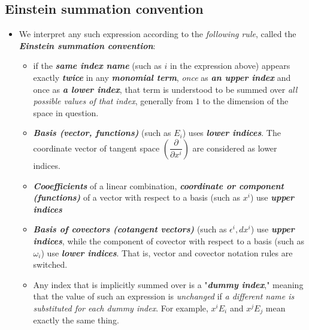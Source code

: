 \documentclass[11pt]{article}
\begin{document}
\subsection{Einstein summation convention}
\begin{itemize}
\item \begin{remark}
We interpret any such expression according to the \emph{following rule}, called the \emph{\textbf{Einstein summation convention}}:
\begin{itemize}
\item if the \textbf{\emph{same index name}} (such as $i$ in the expression above) appears exactly \textbf{\emph{twice}} in any \emph{\textbf{monomial term}}, \emph{once} as \emph{\textbf{an upper index}} and once as \emph{\textbf{a lower index}}, that term is understood to be summed over \emph{all possible values of that index}, generally from $1$ to the dimension of the space in question. 

\item \emph{\textbf{Basis (vector, functions)}} (such as $E_i$) uses  \emph{\textbf{lower indices}}. The coordinate vector of tangent space $(\dfrac{\partial}{\partial x^{i}})$ are considered as lower indices. 

\item \emph{\textbf{Cooefficients}} of a linear combination, \emph{\textbf{coordinate or component (functions)}} of a vector with respect to a basis (such as $x^i$) use \emph{\textbf{upper indices}}

\item \emph{\textbf{Basis of covectors (cotangent vectors)}} (such as $\epsilon^i, dx^i$) use \emph{\textbf{upper indices}}, while the component of covector with respect to a basis (such as $\omega_i$) use  \emph{\textbf{lower indices}}. That is, vector and covector notation rules are switched. 

\item Any index that is implicitly summed over is a "\emph{\textbf{dummy index}}," meaning that the value of such an expression is \emph{unchanged} if \emph{a different name is substituted for each dummy index}. For example, $x^i E_i$ and $x^j E_j$ mean exactly the same thing. 
\end{itemize}
\end{remark}
\end{itemize}
\end{document}
